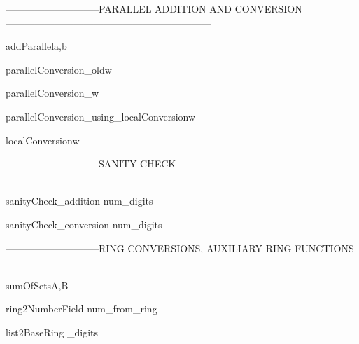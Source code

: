 -----------------------------PARALLEL ADDITION AND CONVERSION---------------------------------------------------------------

\begin{method}{addParallel}{a,b}

\end{method}


\begin{method}{parallelConversion\_old}{w}

\end{method}


\begin{method}{parallelConversion}{\_w}

\end{method}


\begin{method}{parallelConversion\_using\_localConversion}{w}

\end{method}


\begin{method}{localConversion}{w}

\end{method}


-----------------------------SANITY CHECK-----------------------------------------------------------------------------------

\begin{method}{sanityCheck\_addition}{ num\_digits}

\end{method}


\begin{method}{sanityCheck\_conversion}{ num\_digits}

\end{method}


-----------------------------RING CONVERSIONS, AUXILIARY RING FUNCTIONS-----------------------------------------------------

\begin{method}{sumOfSets}{A,B}

\end{method}


\begin{method}{ring2NumberField}{ num\_from\_ring}

\end{method}


\begin{method}{list2BaseRing}{ \_digits}

\end{method}


